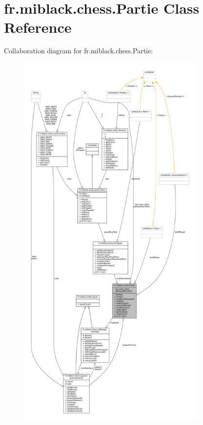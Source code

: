 \section{fr.\-miblack.\-chess.\-Partie Class Reference}
\label{classfr_1_1miblack_1_1chess_1_1Partie}


Collaboration diagram for fr.\-miblack.\-chess.\-Partie\-:
\nopagebreak
\begin{figure}[H]
\begin{center}
\leavevmode
\includegraphics[height=550pt]{classfr_1_1miblack_1_1chess_1_1Partie__coll__graph}
\end{center}
\end{figure}
